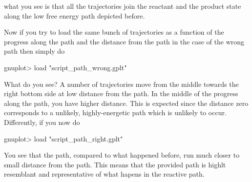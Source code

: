 what you see is that all the trajectories join the reactant and the product state along the low free energy path depicted before.

Now if you try to load the same bunch of trajectories as a function of the progress along the path and the distance from the path in the case of the wrong path then simply do

\begin{DoxyVerb}gnuplot> load "script_path_wrong.gplt"
\end{DoxyVerb}


What do you see? A number of trajectories move from the middle towards the right bottom side at low distance from the path. In the middle of the progress along the path, you have higher distance. This is expected since the distance zero corresponds to a unlikely, highly-\/energetic path which is unlikely to occur. Differently, if you now do

\begin{DoxyVerb}gnuplot> load "script_path_right.gplt"
\end{DoxyVerb}


You see that the path, compared to what happened before, run much closer to small distance from the path. This means that the provided path is highlt resemblant and representative of what hapens in the reactive path.

